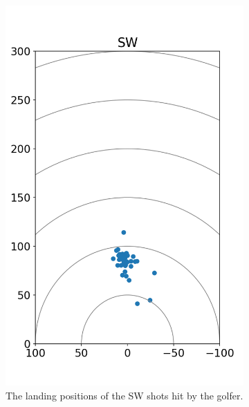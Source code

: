 \documentclass{kththesis}
\begin{document}
\begin{figure}
\begin{subfigure}{0.4\textwidth}
    \includegraphics[height=0.4\textheight]{Shots/SW_shots.png} 
    \caption{The landing positions of the SW shots hit by the golfer.}
    \label{fig:SW_shots}
    \end{subfigure}
    \begin{subfigure}{0.4\textwidth}
    \centering

\end{subfigure}
\end{figure}
\end{document}
